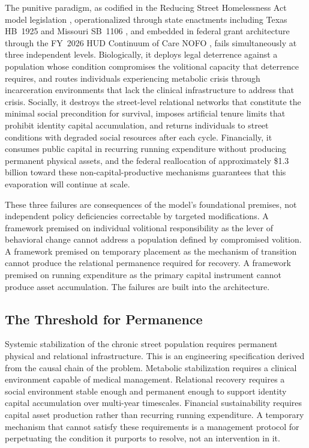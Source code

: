 \documentclass[12pt, letterpaper]{article}
\begin{document}
The punitive paradigm, as codified in the Reducing Street Homelessness Act model legislation \citep{cicero_model_bill}, operationalized through state enactments including Texas HB~1925 \citep{tx_hb1925_2021} and Missouri SB~1106 \citep{mo_sb1106_2022}, and embedded in federal grant architecture through the FY~2026 HUD Continuum of Care NOFO \citep{hud_nofo_2026}, fails simultaneously at three independent levels. Biologically, it deploys legal deterrence against a population whose condition compromises the volitional capacity that deterrence requires, and routes individuals experiencing metabolic crisis through incarceration environments that lack the clinical infrastructure to address that crisis. Socially, it destroys the street-level relational networks that constitute the minimal social precondition for survival, imposes artificial tenure limits that prohibit identity capital accumulation, and returns individuals to street conditions with degraded social resources after each cycle. Financially, it consumes public capital in recurring running expenditure without producing permanent physical assets, and the federal reallocation of approximately \$1.3 billion toward these non-capital-productive mechanisms guarantees that this evaporation will continue at scale.

These three failures are consequences of the model's foundational premises, not independent policy deficiencies correctable by targeted modifications. A framework premised on individual volitional responsibility as the lever of behavioral change cannot address a population defined by compromised volition. A framework premised on temporary placement as the mechanism of transition cannot produce the relational permanence required for recovery. A framework premised on running expenditure as the primary capital instrument cannot produce asset accumulation. The failures are built into the architecture.

\subsection{The Threshold for Permanence}

Systemic stabilization of the chronic street population requires permanent physical and relational infrastructure. This is an engineering specification derived from the causal chain of the problem. Metabolic stabilization requires a clinical environment capable of medical management. Relational recovery requires a social environment stable enough and permanent enough to support identity capital accumulation over multi-year timescales. Financial sustainability requires capital asset production rather than recurring running expenditure. A temporary mechanism that cannot satisfy these requirements is a management protocol for perpetuating the condition it purports to resolve, not an intervention in it.
\end{document}

